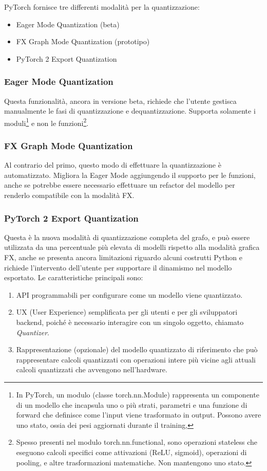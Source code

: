 PyTorch fornisce tre differenti modalità per la quantizzazione:
\begin{itemize}
    \item Eager Mode Quantization (beta)
    \item FX Graph Mode Quantization (prototipo)
    \item PyTorch 2 Export Quantization
\end{itemize}
\subsubsection{Eager Mode Quantization}
Questa funzionalità, ancora in versione beta, richiede che l'utente gestisca manualmente le fasi di quantizzazione e dequantizzazione.
Supporta solamente i moduli\footnote{In PyTorch, un modulo (classe torch.nn.Module) rappresenta un componente di un modello che incapsula uno o più strati, parametri e una funzione di forward che definisce come l'input viene trasformato in output. Possono avere uno stato, ossia dei pesi aggiornati durante il training,}
e non le funzioni\footnote{Spesso presenti nel modulo torch.nn.functional, sono operazioni stateless che eseguono calcoli specifici come attivazioni (ReLU, sigmoid), operazioni di pooling, e altre trasformazioni matematiche. Non mantengono uno stato.}.

\subsubsection{FX Graph Mode Quantization}
Al contrario del primo, questo modo di effettuare la quantizzazione è automatizzato. Migliora la Eager Mode aggiungendo il supporto per le funzioni,
anche se potrebbe essere necessario effettuare un refactor del modello per renderlo compatibile con la modalità FX.

\subsubsection{PyTorch 2 Export Quantization}
Questa è la nuova modalità di quantizzazione completa del grafo, e può essere utilizzata da una percentuale più elevata di modelli rispetto alla
modalità grafica FX, anche se presenta ancora limitazioni riguardo alcuni costrutti Python e richiede l'intervento dell'utente per supportare il
dinamismo nel modello esportato. Le caratteristiche principali sono:
\begin{enumerate}
    \item API programmabili per configurare come un modello viene quantizzato.
    \item UX (User Experience) semplificata per gli utenti e per gli sviluppatori backend, poiché è necessario interagire con un singolo oggetto, chiamato \textit{Quantizer}.
    \item Rappresentazione (opzionale) del modello quantizzato di riferimento che può rappresentare calcoli quantizzati con operazioni intere più vicine agli attuali calcoli quantizzati che avvengono nell'hardware.
\end{enumerate}

